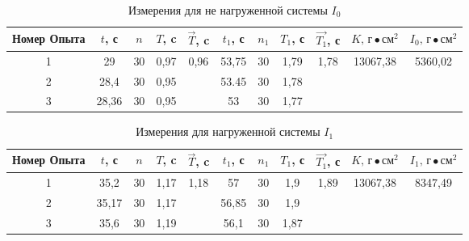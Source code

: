 %
\begin{table}[ht]
    \centering

    \begin{tabular}{|c|c|c|c|c|c|c|c|c|c|c|}
        \hline
        Номер Опыта & $t$, с & $n$ & $T$, c &  $\vec{T}$, c       & $t_1$, с & $n_1$ & $T_1$, с & $\vec{T_1}$, с        & $K \text{, г}\bullet\text{см}^2$ & $I_0\text{, г}\bullet\text{см}^2$ \\
        \hline
                  1 & 29     & 30  & 0,97   &\multirow{3}{*}{0,96}& 53,75    &  30   & 1,79     & \multirow{3}{*}{1,78} & \multirow{1}{*}{13067,38}        & \multirow{3}{*}{5360,02}          \\
        \hline
                  2 & 28,4   & 30  & 0,95   &                     & 53.45    &  30   & 1,78     &                       &                                  &                                   \\
        \hline
                  3 & 28,36  & 30  & 0,95   &                     & 53       &  30   & 1,77     &                       &                                  &                                   \\
        \hline
    \end{tabular}

    \caption{Измерения для не нагруженной системы $I_0$} \label{table-1}
\end{table}

\begin{table}[ht]
    \centering
    
    \begin{tabular}{|c|c|c|c|c|c|c|c|c|c|c|}
        \hline
        Номер Опыта & $t$, с & $n$ & $T$, c &     $\vec{T}$, c      & $t_1$, с & $n_1$ & $T_1$, с & $\vec{T_1}$, с         & $K \text{, г}\bullet\text{см}^2$ & $I_1\text{, г}\bullet\text{см}^2$ \\
        \hline
                  1 &  35,2  & 30  &  1,17  & \multirow{3}{*}{1,18} &   57     &  30   &  1,9     & \multirow{3}{*}{1,89}  &     \multirow{3}{*}{13067,38 }   & \multirow{3}{*}{8347,49}          \\
        \hline
                  2 &  35,17 & 30  &  1,17  &                       &   56,85  &  30   &  1,9     &                        &                                  &                                   \\
        \hline
                  3 &  35,6  & 30  &  1,19  &                       &   56,1   &  30   &  1,87    &                        &                                  &                                   \\
        \hline
    \end{tabular}

    \caption{Измерения для нагруженной системы $I_1$} \label{table-2}
\end{table}

